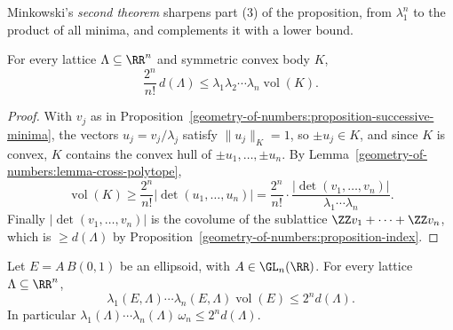 Minkowski's \emph{second theorem} sharpens part (3) of the proposition, from $\lambda_1^n$ to the product of all minima, and complements it with a lower bound.

\begin{proposition}\label{geometry-of-numbers:proposition-second-lower}
For every lattice $\Lambda \subseteq \RR^n$ and symmetric convex body $K$,
\[
\frac{2^n}{n!}\,d(\Lambda) \leq \lambda_1\lambda_2\cdots\lambda_n\operatorname{vol}(K).
\]
\end{proposition}

\begin{proof}
With $v_j$ as in Proposition~\ref{geometry-of-numbers:proposition-successive-minima}, the vectors $u_j = v_j/\lambda_j$ satisfy $\|u_j\|_K = 1$, so $\pm u_j \in K$, and since $K$ is convex, $K$
contains the convex hull of $\pm u_1, \ldots, \pm u_n$. By Lemma~\ref{geometry-of-numbers:lemma-cross-polytope},
\[
\operatorname{vol}(K) \geq \frac{2^n}{n!}|\det(u_1, \ldots, u_n)| = \frac{2^n}{n!}\cdot\frac{|\det(v_1, \ldots, v_n)|}{\lambda_1\cdots\lambda_n}.
\]
Finally $|\det(v_1, \ldots, v_n)|$ is the covolume of the sublattice $\ZZ v_1 + \cdots + \ZZ v_n$, which is $\geq d(\Lambda)$ by Proposition~\ref{geometry-of-numbers:proposition-index}.
\end{proof}

\begin{proposition}\label{geometry-of-numbers:proposition-second-ellipsoid}
Let $E = A\,B(0, 1)$ be an ellipsoid, with $A \in \GL_n(\RR)$. For every lattice $\Lambda \subseteq \RR^n$,
\[
\lambda_1(E, \Lambda)\cdots\lambda_n(E, \Lambda)\operatorname{vol}(E) \leq 2^nd(\Lambda).
\]
In particular $\lambda_1(\Lambda)\cdots\lambda_n(\Lambda)\,\omega_n \leq 2^nd(\Lambda)$.
\end{proposition}

